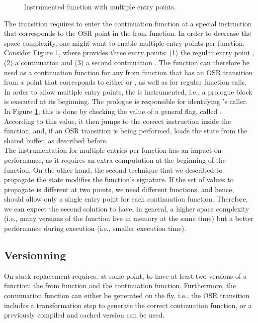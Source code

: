\begin{figure}[h!]
\centering
\begin{subfigure}{.8\textwidth}
\end{subfigure}
\caption{Instrumented function with multiple entry points.}
\label{fig:multipleentry}
\end{figure}

The transition requires to enter the continuation function at a special instruction that corresponds to the OSR point in the from function.
In order to decrease the space complexity, one might want to enable multiple entry points per function.
Consider Figure \ref{fig:multipleentry}, where  provides three entry points: (1) the regular entry point , (2) a continuation  and (3) a second continuation .
The function  can therefore be used as a continuation function for any from function that has an OSR transition from a point that corresponds to either  or , as well as for regular function calls.
In order to allow multiple entry points, the  is instrumented, i.e., a prologue block is executed at its beginning.
The prologue is responsible for identifying 's caller. 
In Figure \ref{fig:multipleentry}, this is done by checking the value of a general flag, called .
According to this value, it then jumps to the correct instruction inside the function, and, if an OSR transition is being performed, loads the state from the shared buffer, as described before.\\

The instrumentation for multiple entries per function has an impact on performance, as it requires an extra computation at the beginning of the function. 
On the other hand, the second technique that we described to propagate the state modifies the function's signature.
If the set of values to propagate is different at two points, we need different functions, and hence, should allow only a single entry point for each continuation function.
Therefore, we can expect the second solution to have, in general, a higher space complexity (i.e., many versions of the function live in memory at the same time) but a better performance during execution (i.e., smaller execution time).\\

\subsection{Versionning}
On-stack replacement requires, at some point, to have at least two versions of a function: the from function and the continuation function.
Furthermore, the continuation function can either be generated on the fly, i.e., the OSR transition includes a transformation step to generate the correct continuation function, or a previously compiled and cached version can be used.

